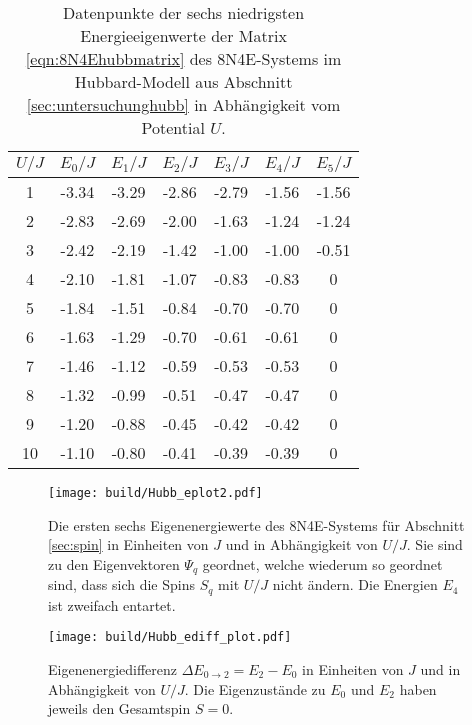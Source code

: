 \begin{table}[H]
  \centering
  \caption{Datenpunkte der sechs niedrigsten Energieeigenwerte der Matrix \eqref{eqn:8N4Ehubbmatrix} des 8N4E-Systems im Hubbard-Modell aus Abschnitt \ref{sec:untersuchunghubb} in Abhängigkeit vom Potential $U$.}
  \begin{tabular}{S[table-format=1.0] S[table-format=2.2] S[table-format=2.2] S[table-format=2.2] S[table-format=2.2] S[table-format=2.2] S[table-format=2.2]}
    \toprule
    {$U/J$} & {$E_0/J$} & {$E_1/J$} & {$E_2/J$} & {$E_3/J$} & {$E_4/J$} & {$E_5/J$} \\
      & -3.34 & -3.29 & -2.86 & -2.79 & -1.56 & -1.56 \\
    2  & -2.83 & -2.69 & -2.00 & -1.63 & -1.24 & -1.24 \\
    3  & -2.42 & -2.19 & -1.42 & -1.00 & -1.00 & -0.51 \\
    4  & -2.10 & -1.81 & -1.07 & -0.83 & -0.83 & 0     \\
    5  & -1.84 & -1.51 & -0.84 & -0.70 & -0.70 & 0     \\
    6  & -1.63 & -1.29 & -0.70 & -0.61 & -0.61 & 0     \\
    7  & -1.46 & -1.12 & -0.59 & -0.53 & -0.53 & 0     \\
    8  & -1.32 & -0.99 & -0.51 & -0.47 & -0.47 & 0     \\
    9  & -1.20 & -0.88 & -0.45 & -0.42 & -0.42 & 0     \\
    10 & -1.10 & -0.80 & -0.41 & -0.39 & -0.39 & 0     \\
    \bottomrule
  \end{tabular}
  \label{tab:eigenwerte}
\end{table}

\begin{figure}[H]
  \centering
  \texttt{[image: build/Hubb\_eplot2.pdf]}
  \caption{Die ersten sechs Eigenenergiewerte des 8N4E-Systems für Abschnitt \ref{sec:spin} in Einheiten von $J$ und in Abhängigkeit von $U/J$. Sie sind zu den Eigenvektoren $\Psi_q$ geordnet, welche wiederum so geordnet sind,
  dass sich die Spins $S_q$ mit $U/J$ nicht ändern. Die Energien $E_4$ ist zweifach entartet.}
  \label{fig:eplot2}
\end{figure}

\begin{figure}[H]
  \centering
  \texttt{[image: build/Hubb\_ediff\_plot.pdf]}
  \caption{Eigenenergiedifferenz $\Delta E_{0 \to 2} = E_2 - E_0$ in Einheiten von $J$ und in Abhängigkeit von $U/J$. Die Eigenzustände zu $E_0$ und $E_2$ haben jeweils den Gesamtspin $S=0$.}
  \label{fig:ediffplot}
\end{figure}

